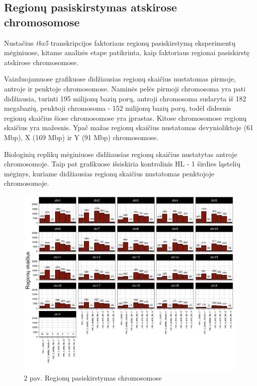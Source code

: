 \documentclass[12pt]{article}
\begin{document}
\newpage

\subsection{Regionų pasiskirstymas atskirose chromosomose}
Nustačius \emph{tbx5} transkripcijos faktoriaus regionų
pasiskirstymą eksperimentų mėginiuose, kitame analizės etape
patikrinta, kaip faktoriaus regionai pasiskirstę atskirose
chromosomose.

Vaizduojamuose grafikuose didžiausias regionų skaičius nustatomas
pirmoje, antroje ir penktoje chromosomose. Naminės pelės pirmoji
chromosoma yra pati didžiausia, turinti 195 milijonų bazių porų,
antroji chromosoma sudaryta iš 182 megabazių, penktoji chromosoma -
152 milijonų bazių porų, todėl didesnis regionų skaičius šiose
chromosomose yra įprastas. Kitose chromosomose regionų skaičius
yra mažesnis. Ypač mažas regionų skaičius nustatomas devynioliktoje
(61 Mbp), X (169 Mbp) ir Y (91 Mbp) chromosomose.

Biologinių replikų mėginiuose didžiausias regionų skaičius
nustatytas antroje chromosomoje. Taip pat grafikuose išsiskiria
kontrolinis HL - 1 širdies ląstelių mėginys, kuriame didžiausias
regionų skaičius nustatomas penktojoje chromosomoje.

\begin{figure}[htb]
    \begin{center}
        \includegraphics[width=0.8\linewidth]{Figures/peak_counts_by_chromosome.png}
        \caption*{2 pav. Regionų pasiskirstymas chromosomose}
    \end{center}
\end{figure}
\end{document}
